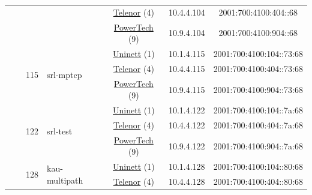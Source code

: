 \begin{small}
\begin{center}
\begin{longtable}{|c|c|c|c|c|c|c|c|}
  &  & \multicolumn{2}{|c|}{} & \multicolumn{2}{|c|}{\tiny{\href{https://www.telenor.no}{Telenor} (4)}} & \tiny{10.4.4.104} & \tiny{2001:700:4100:404::68} \\* \cline{5-5}\cline{6-6}\cline{7-7}\cline{8-8}
  &  & \multicolumn{2}{|c|}{} & \multicolumn{2}{|c|}{\tiny{\href{http://www.powertech.no}{PowerTech} (9)}} & \tiny{10.9.4.104} & \tiny{2001:700:4100:904::68} \\* \cline{3-3}\cline{4-4}\cline{5-5}\cline{6-6}\cline{7-7}\cline{8-8}
  &  & \multirow{3}{*}{\tiny{115}} & \multicolumn{1}{|l|}{\multirow{3}{*}{\tiny{srl-mptcp}}} & \multicolumn{2}{|c|}{\tiny{\href{https://www.uninett.no}{Uninett} (1)}} & \tiny{10.1.4.115} & \tiny{2001:700:4100:104::73:68} \\* \cline{5-5}\cline{6-6}\cline{7-7}\cline{8-8}
  &  &  &  & \multicolumn{2}{|c|}{\tiny{\href{https://www.telenor.no}{Telenor} (4)}} & \tiny{10.4.4.115} & \tiny{2001:700:4100:404::73:68} \\* \cline{5-5}\cline{6-6}\cline{7-7}\cline{8-8}
  &  &  &  & \multicolumn{2}{|c|}{\tiny{\href{http://www.powertech.no}{PowerTech} (9)}} & \tiny{10.9.4.115} & \tiny{2001:700:4100:904::73:68} \\* \cline{3-3}\cline{4-4}\cline{5-5}\cline{6-6}\cline{7-7}\cline{8-8}
  &  & \multirow{3}{*}{\tiny{122}} & \multicolumn{1}{|l|}{\multirow{3}{*}{\tiny{srl-test}}} & \multicolumn{2}{|c|}{\tiny{\href{https://www.uninett.no}{Uninett} (1)}} & \tiny{10.1.4.122} & \tiny{2001:700:4100:104::7a:68} \\* \cline{5-5}\cline{6-6}\cline{7-7}\cline{8-8}
  &  &  &  & \multicolumn{2}{|c|}{\tiny{\href{https://www.telenor.no}{Telenor} (4)}} & \tiny{10.4.4.122} & \tiny{2001:700:4100:404::7a:68} \\* \cline{5-5}\cline{6-6}\cline{7-7}\cline{8-8}
  &  &  &  & \multicolumn{2}{|c|}{\tiny{\href{http://www.powertech.no}{PowerTech} (9)}} & \tiny{10.9.4.122} & \tiny{2001:700:4100:904::7a:68} \\* \cline{3-3}\cline{4-4}\cline{5-5}\cline{6-6}\cline{7-7}\cline{8-8}
  &  & \multirow{3}{*}{\tiny{128}} & \multicolumn{1}{|l|}{\multirow{3}{*}{\tiny{kau-multipath}}} & \multicolumn{2}{|c|}{\tiny{\href{https://www.uninett.no}{Uninett} (1)}} & \tiny{10.1.4.128} & \tiny{2001:700:4100:104::80:68} \\* \cline{5-5}\cline{6-6}\cline{7-7}\cline{8-8}
  &  &  &  & \multicolumn{2}{|c|}{\tiny{\href{https://www.telenor.no}{Telenor} (4)}} & \tiny{10.4.4.128} & \tiny{2001:700:4100:404::80:68} \\* \cline{5-5}\cline{6-6}\cline{7-7}\cline{8-8}

\end{longtable}
\end{center}
\end{small}
